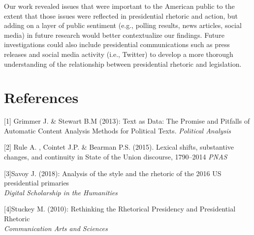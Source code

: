 \documentclass{article}
\begin{document}
{Our work revealed issues that were important to the American public to the extent that those issues were reflected in presidential rhetoric and action, but adding on a layer of public sentiment (e.g., polling results, news articles, social media) in future research would better contextualize our findings. Future investigations could also include presidential communications such as press releases and social media activity (i.e., Twitter) to develop a more thorough understanding of the relationship between presidential rhetoric and legislation.
}

\section{References}\label{sec_ref}

[1] Grimmer J. \& Stewart B.M (2013): Text as Data: The Promise and Pitfalls of Automatic Content Analysis Methods for Political Texts. 
{\it Political Analysis}

[2] Rule A. , Cointet J.P. \& Bearman P.S. (2015). Lexical shifts, substantive changes, and continuity in State of the Union discourse, 1790–2014 
{\it PNAS}

[3]Savoy J. (2018): Analysis of the style and the rhetoric of the 2016 US presidential primaries \\ 
{\it Digital Scholarship in the Humanities}

[4]Stuckey M. (2010): Rethinking the Rhetorical Presidency and Presidential Rhetoric \\ 
{\it Communication Arts and Sciences}
\newpage
\pagebreak
\end{document}

